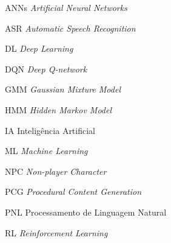 \begin{siglas}
 \item[ANNs] \textit{Artificial Neural Networks}
 \item[ASR] \textit{Automatic Speech Recognition}
 \item[DL] \textit{Deep Learning}
 \item[DQN] \textit{Deep Q-network}
 \item[GMM] \textit{Gaussian Mixture Model}
 \item[HMM] \textit{Hidden Markov Model}
 \item[IA] Inteligência Artificial
 \item[ML] \textit{Machine Learning}
 \item[NPC] \textit{Non-player Character}
 \item[PCG] \textit{Procedural Content Generation}
 \item[PNL] Processamento de Linguagem Natural
 \item[RL] \textit{Reinforcement Learning}
\end{siglas}

